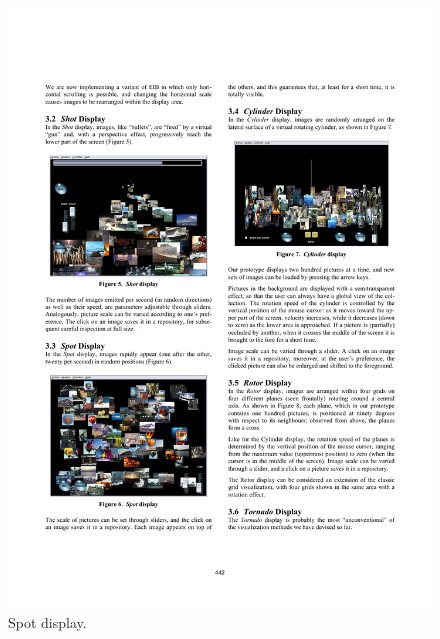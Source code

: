 \begin{figure}[ht]
	\begin{minipage}[b]{0.5\textwidth}
		\centering
		\includegraphics[width=\textwidth]{imgs/Porta-spot}
		\caption{Spot display.}
		\label{fig:porta-spot}
	\end{minipage}
	\begin{minipage}[b]{0.5\textwidth}
		\centering

\end{minipage}
\end{figure}

